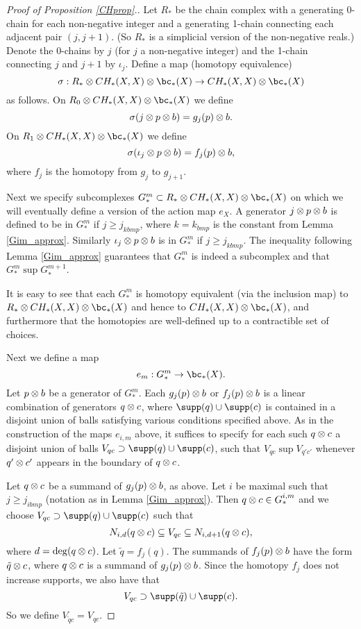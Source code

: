 \begin{proof}[Proof of Proposition \ref{CHprop}.]
\medskip

Let $R_*$ be the chain complex with a generating 0-chain for each non-negative
integer and a generating 1-chain connecting each adjacent pair $(j, j+1)$.
(So $R_*$ is a simplicial version of the non-negative reals.)
Denote the 0-chains by $j$ (for $j$ a non-negative integer) and the 1-chain connecting $j$ and $j+1$
by $\iota_j$.
Define a map (homotopy equivalence)
\[
	\sigma: R_*\ot CH_*(X, X) \otimes \bc_*(X) \to CH_*(X, X)\ot \bc_*(X)
\]
as follows.
On $R_0\ot CH_*(X, X) \otimes \bc_*(X)$ we define
\[
	\sigma(j\otimes p\otimes b) = g_j(p)\otimes b .
\]
On $R_1\ot CH_*(X, X) \otimes \bc_*(X)$ we define
\[
	\sigma(\iota_j\otimes p\otimes b) = f_j(p)\otimes b ,
\]
where $f_j$ is the homotopy from $g_j$ to $g_{j+1}$.

Next we specify subcomplexes $G^m_* \sub R_*\ot CH_*(X, X) \otimes \bc_*(X)$ on which we will eventually
define a version of the action map $e_X$.
A generator $j\otimes p\otimes b$ is defined to be in $G^m_*$ if $j\ge j_{kbmp}$, where
$k = k_{bmp}$ is the constant from Lemma \ref{Gim_approx}.
Similarly $\iota_j\otimes p\otimes b$ is in $G^m_*$ if $j\ge j_{kbmp}$.
The inequality following Lemma \ref{Gim_approx} guarantees that $G^m_*$ is indeed a subcomplex
and that $G^m_* \sup G^{m+1}_*$.

It is easy to see that each $G^m_*$ is homotopy equivalent (via the inclusion map) 
to $R_*\ot CH_*(X, X) \otimes \bc_*(X)$
and hence to $CH_*(X, X) \otimes \bc_*(X)$, and furthermore that the homotopies are well-defined
up to a contractible set of choices.

Next we define a map
\[
	e_m : G^m_* \to \bc_*(X) .
\]
Let $p\otimes b$ be a generator of $G^m_*$.
Each $g_j(p)\otimes b$ or $f_j(p)\otimes b$ is a linear combination of generators $q\otimes c$,
where $\supp(q)\cup\supp(c)$ is contained in a disjoint union of balls satisfying 
various conditions specified above.
As in the construction of the maps $e_{i,m}$ above,
it suffices to specify for each such $q\otimes c$ a disjoint union of balls
$V_{qc} \sup \supp(q)\cup\supp(c)$, such that $V_{qc} \sup V_{q'c'}$
whenever $q'\otimes c'$ appears in the boundary of $q\otimes c$.

Let $q\otimes c$ be a summand of $g_j(p)\otimes b$, as above.
Let $i$ be maximal such that $j\ge j_{ibmp}$
(notation as in Lemma \ref{Gim_approx}).
Then $q\otimes c \in G^{i,m}_*$ and we choose $V_{qc} \sup \supp(q)\cup\supp(c)$
such that 
\[
	N_{i,d}(q\otimes c) \subseteq V_{qc} \subseteq N_{i,d+1}(q\otimes c) ,
\]
where $d = \deg(q\otimes c)$.
Let $\tilde q = f_j(q)$.
The summands of $f_j(p)\otimes b$ have the form $\tilde q \otimes c$, 
where $q\otimes c$ is a summand of $g_j(p)\otimes b$.
Since the homotopy $f_j$ does not increase supports, we also have that
\[
	V_{qc} \sup \supp(\tilde q) \cup \supp(c) .
\]
So we define $V_{\tilde qc} = V_{qc}$.


\end{proof}
